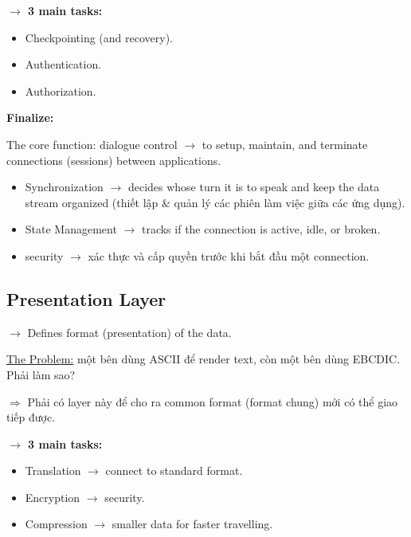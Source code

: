 \noindent
\textbf{$\rightarrow$ 3 main tasks:}

\begin{itemize}
    \item Checkpointing (and recovery).
    \item Authentication.
    \item Authorization.
\end{itemize}

\noindent
\textbf{Finalize:}
\medskip

\noindent
The core function: dialogue control $\rightarrow$ to setup, maintain, and terminate connections (sessions) between applications.

\begin{itemize}
    \item Synchronization $\rightarrow$ decides whose turn it is to speak and keep the data stream organized (thiết lập \& quản lý các phiên làm việc giữa các ứng dụng).
    \item State Management $\rightarrow$ tracks if the connection is active, idle, or broken.
    \item security $\rightarrow$ xác thực và cấp quyền trước khi bắt đầu một connection.
\end{itemize}


\subsection{Presentation Layer}

\noindent
$\rightarrow$ Defines format (presentation) of the data.
\medskip

\noindent
\underline{The Problem:} một bên dùng ASCII để render text, còn một bên dùng EBCDIC. Phải làm sao?

$\Rightarrow$ Phải có layer này để cho ra common format (format chung) mới có thể giao tiếp được.
\medskip

\noindent
\textbf{$\rightarrow$ 3 main tasks:}

\begin{itemize}
    \item Translation $\rightarrow$ connect to standard format.
    \item Encryption $\rightarrow$ security.
    \item Compression $\rightarrow$ smaller data for faster travelling.
\end{itemize}

